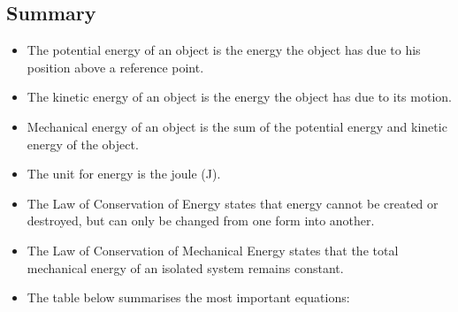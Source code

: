            \subsection{ Summary}
            \nopagebreak
            
      
      \label{m38786*id70947}\begin{itemize}[noitemsep]
            \label{m38786*uid111}\item The potential energy of an object is the energy the object has due to his position above a reference point.
\label{m38786*uid112}\item The kinetic energy of an object is the energy the object has due to its motion.
\label{m38786*uid113}\item Mechanical energy of an object is the sum of the potential energy and kinetic energy of the object.
\label{m38786*uid114}\item The unit for energy is the joule (J).
\label{m38786*uid115}\item The Law of Conservation of Energy states that energy cannot be created or destroyed, but can only be changed from one form into another.
\label{m38786*uid116}\item The Law of Conservation of Mechanical Energy states that the total mechanical energy of an isolated system remains constant.
\label{m38786*uid117}\item The table below summarises the most important equations:
\end{itemize}
        
      
    
      
    
    \setlength\mytablespace{4\tabcolsep}
    \addtolength\mytablespace{3\arrayrulewidth}
    \setlength\mytablewidth{\linewidth}
        
    
    \setlength\mytableroom{\mytablewidth}
    \addtolength\mytableroom{-\mytablespace}
    
    \setlength\myfixedwidth{0pt}
    \setlength\mystarwidth{\mytableroom}
        \addtolength\mystarwidth{-\myfixedwidth}
        \divide{}
        
